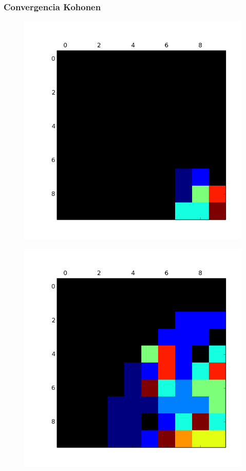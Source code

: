 \subsubsection{Convergencia Kohonen}

\begin{figure}[h!]
\centering
\begin{minipage}{.15\textwidth}
  \centering
  \includegraphics[width=.9\linewidth]{convergencia_kohonen/entrenamiento_0.png}
  \label{fig:test1}
\end{minipage}%
\begin{minipage}{.15\textwidth}
  \centering
  \includegraphics[width=.9\linewidth]{convergencia_kohonen/entrenamiento_25.png}

\end{minipage}
\end{figure}
